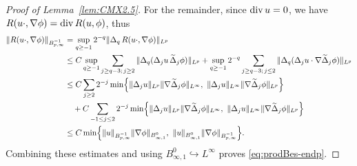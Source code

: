 \documentclass[reqno,11pt,a4paper]{amsart}
\renewcommand{\div}{{\rm div\,}}
\begin{document}
\begin{proof}[Proof of Lemma~\ref{lem:CMX2.5}]
For the remainder, since $\div u=0$, we have $R(u\cdot,\nabla \phi) = \div R(u,\phi) $, thus
\begin{align*}
  \Vert R(u\cdot,\nabla \phi)\Vert _{B^{-1}_{p,\infty}} 
  & = \sup_{q\geq -1} 2^{-q}\Vert \Delta_q\, R(u\cdot,\nabla \phi)\Vert _{L^p}  \\
  &\leq  C \sup_{q\geq -1} \sum_{\substack{j\ge q-3;\,j\ge 2 }}
  \Vert \Delta_q(\Delta_j u\,\widetilde{\Delta}_j\phi)\Vert _{L^p}
  + \sup_{q\geq -1} 2^{-q}\sum_{\substack{j\ge q-3;\,j\leq 2 }}
  \Vert \Delta_q(\Delta_j u\cdot \nabla \widetilde{\Delta}_j\phi)\Vert _{L^p} \\
  &\leq C  \sum_{\substack{ j\ge 2}} 2^{-j}
  \min\Bigl\{\Vert \Delta_j u\Vert _{L^p}\Vert \nabla \widetilde{\Delta}_j\phi\Vert _{L^\infty},
  \ \Vert \Delta_j u\Vert _{L^\infty}\Vert \nabla \widetilde{\Delta}_j\phi\Vert _{L^p}\Bigr\}\\
  &\quad+ C  \sum_{\substack{-1\leq j\leq 2}} 2^{-j}
  \min\Bigl\{\Vert \Delta_j u\Vert _{L^p}\Vert \nabla \widetilde{\Delta}_j\phi\Vert _{L^\infty},
  \ \Vert \Delta_j u\Vert _{L^\infty}\Vert \nabla \widetilde{\Delta}_j\phi\Vert _{L^p}\Bigr\}\\
  &\leq C \min\Bigl\{\Vert u\Vert _{B^{-1}_{p,\infty}}\Vert \nabla \phi\Vert _{B^0_{\infty,1}},
  \ \Vert u\Vert _{B^0_{\infty,1}}\Vert \nabla\phi\Vert _{B^{-1}_{p,\infty}}\Bigr\}.
\end{align*}
Combining these estimates and using
$B^0_{\infty,1}\hookrightarrow L^\infty$
proves \eqref{eq:prodBes-endp}.


\end{proof}
\end{document}
